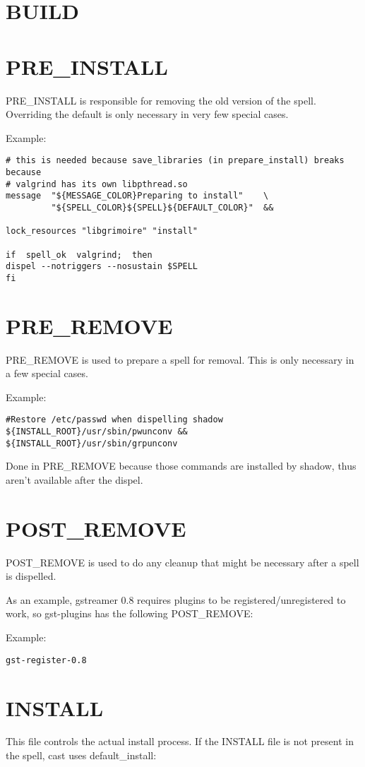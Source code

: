 \documentclass[a4paper,10pt]{book}
\begin{document}
\section{BUILD}
\section{PRE\_INSTALL}
PRE\_INSTALL is responsible for removing the old version of the spell.
Overriding the default is only necessary in very few special cases.

Example:
\begin{verbatim}
# this is needed because save_libraries (in prepare_install) breaks because
# valgrind has its own libpthread.so
message  "${MESSAGE_COLOR}Preparing to install"    \
         "${SPELL_COLOR}${SPELL}${DEFAULT_COLOR}"  &&

lock_resources "libgrimoire" "install"

if  spell_ok  valgrind;  then
dispel --notriggers --nosustain $SPELL
fi
\end{verbatim}

\section{PRE\_REMOVE}
PRE\_REMOVE is used to prepare a spell for removal. This is only necessary in a
few special cases.

Example:
\begin{verbatim}
#Restore /etc/passwd when dispelling shadow
${INSTALL_ROOT}/usr/sbin/pwunconv &&
${INSTALL_ROOT}/usr/sbin/grpunconv
\end{verbatim}

Done in PRE\_REMOVE because those commands are installed by shadow, thus aren't
available after the dispel.

\section{POST\_REMOVE}
POST\_REMOVE is used to do any cleanup that might be necessary after a spell is
dispelled.

As an example, gstreamer 0.8 requires plugins to be registered/unregistered to
work, so gst-plugins has the following POST\_REMOVE:

Example:
\begin{verbatim}
gst-register-0.8
\end{verbatim}

\section{INSTALL}
This file controls the actual install process.  If the INSTALL file is not
present in the spell, cast uses default\_install:
\end{document}
